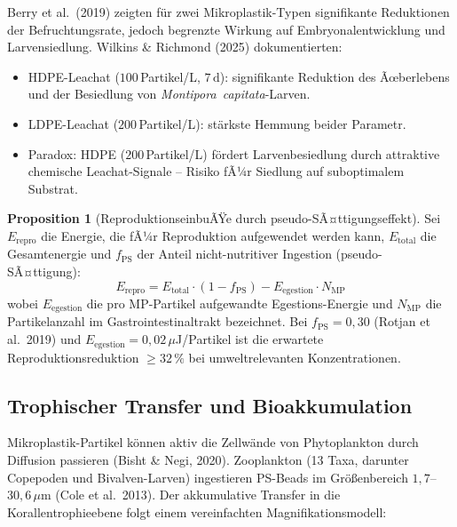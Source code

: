 ﻿\documentclass[12pt,a4paper]{article}
\theoremstyle{definition}
\newtheorem{proposition}{Proposition}[section]
\theoremstyle{remark}
\newcommand{\MP}{Mikroplastik}
\begin{document}
Berry et al.\ (2019) zeigten f\"ur zwei \MP{}-Typen signifikante Reduktionen
der Befruchtungsrate, jedoch begrenzte Wirkung auf Embryonalentwicklung und
Larvensiedlung. Wilkins \& Richmond (2025) dokumentierten:
\begin{itemize}[noitemsep]
  \item HDPE-Leachat ($100$\,Partikel/L, $7\,\text{d}$): signifikante Reduktion
    des Ãœberlebens und der Besiedlung von \textit{Montipora~capitata}-Larven.
  \item LDPE-Leachat ($200$\,Partikel/L): st\"arkste Hemmung beider Parametr.
  \item Paradox: HDPE ($200$\,Partikel/L) f\"ordert Larvenbesiedlung durch
    attraktive chemische Leachat-Signale -- Risiko fÃ¼r Siedlung auf suboptimalem Substrat.
\end{itemize}

\begin{proposition}[ReproduktionseinbuÃŸe durch pseudo-SÃ¤ttigungseffekt]
Sei $E_{\text{repro}}$ die Energie, die fÃ¼r Reproduktion aufgewendet werden kann,
$E_{\text{total}}$ die Gesamtenergie und $f_{\text{PS}}$ der Anteil
nicht-nutritiver Ingestion (pseudo-SÃ¤ttigung):
\begin{equation}
  E_{\text{repro}} = E_{\text{total}} \cdot (1 - f_{\text{PS}}) -
                     E_{\text{egestion}} \cdot N_{\text{MP}}
  \label{eq:repro_energy}
\end{equation}
wobei $E_{\text{egestion}}$ die pro MP-Partikel aufgewandte Egestions-Energie und
$N_{\text{MP}}$ die Partikelanzahl im Gastrointestinaltrakt bezeichnet.
Bei $f_{\text{PS}} = 0{,}30$ (Rotjan et al.\ 2019) und
$E_{\text{egestion}} = 0{,}02\,\mu$J/Partikel ist die erwartete Reproduktionsreduktion
$\geq 32\,\%$ bei umweltrelevanten Konzentrationen.
\end{proposition}

\subsection{Trophischer Transfer und Bioakkumulation}
\label{subsec:trophic}

\MP{}-Partikel k\"onnen aktiv die Zellw\"ande von Phytoplankton durch Diffusion
passieren (Bisht \& Negi, 2020). Zooplankton (13 Taxa, darunter Copepoden und
Bivalven-Larven) ingestieren PS-Beads im Gr\"o\ss{}enbereich
$1{,}7$--$30{,}6\,\mu$m (Cole et al.\ 2013). Der akkumulative Transfer in die
Korallentrophieebene folgt einem vereinfachten Magnifikationsmodell:
\end{document}
